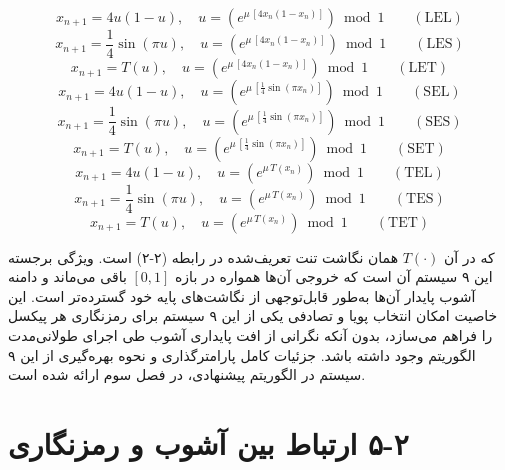 \begin{equation}
x_{n+1} = 4u(1-u), \quad u = \left(e^{\mu\, [4x_n(1-x_n)]}\right) \bmod 1 \qquad (\text{LEL}) 
\end{equation}
\begin{equation}
x_{n+1} = \frac{1}{4}\sin(\pi u), \quad u = \left(e^{\mu\, [4x_n(1-x_n)]}\right) \bmod 1 \qquad (\text{LES}) 
\end{equation}
\begin{equation}
x_{n+1} = T(u), \quad u = \left(e^{\mu\, [4x_n(1-x_n)]}\right) \bmod 1 \qquad (\text{LET}) 
\end{equation}
\begin{equation}
x_{n+1} = 4u(1-u), \quad u = \left(e^{\mu\, [\frac{1}{4}\sin(\pi x_n)]}\right) \bmod 1 \qquad (\text{SEL}) 
\end{equation}
\begin{equation}
x_{n+1} = \frac{1}{4}\sin(\pi u), \quad u = \left(e^{\mu\, [\frac{1}{4}\sin(\pi x_n)]}\right) \bmod 1 \qquad (\text{SES}) 
\end{equation}
\begin{equation}
x_{n+1} = T(u), \quad u = \left(e^{\mu\, [\frac{1}{4}\sin(\pi x_n)]}\right) \bmod 1 \qquad (\text{SET}) 
\end{equation}
\begin{equation}
x_{n+1} = 4u(1-u), \quad u = \left(e^{\mu\, T(x_n)}\right) \bmod 1 \qquad (\text{TEL}) 
\end{equation}
\begin{equation}
x_{n+1} = \frac{1}{4}\sin(\pi u), \quad u = \left(e^{\mu\, T(x_n)}\right) \bmod 1 \qquad (\text{TES}) 
\end{equation}
\begin{equation}
x_{n+1} = T(u), \quad u = \left(e^{\mu\, T(x_n)}\right) \bmod 1 \qquad (\text{TET}) 
\end{equation}

که در آن $T(\cdot)$ همان نگاشت تنت تعریف‌شده در رابطه (۲-۲) است. ویژگی برجسته این ۹ سیستم آن است که خروجی آن‌ها همواره در بازه $[0,1]$ باقی می‌ماند و دامنه آشوب پایدار آن‌ها به‌طور قابل‌توجهی از نگاشت‌های پایه خود گسترده‌تر است\cite{ref4}. این خاصیت امکان انتخاب پویا و تصادفی یکی از این ۹ سیستم برای رمزنگاری هر پیکسل را فراهم می‌سازد، بدون آنکه نگرانی از افت پایداری آشوب طی اجرای طولانی‌مدت الگوریتم وجود داشته باشد. جزئیات کامل پارامترگذاری و نحوه بهره‌گیری از این ۹ سیستم در الگوریتم پیشنهادی، در فصل سوم ارائه شده است.

\section{‏۲‏-‏۵‏ ارتباط بین آشوب و رمزنگاری}

